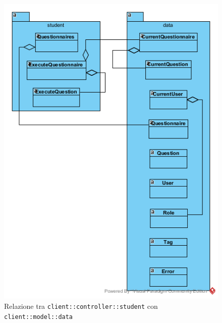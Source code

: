 \begin{center}
	\begin{figure}[H]
		\centering \includegraphics[scale=4, max width=\textwidth, max height=\myheight]{../img/diagrammiClassi/client/controller/controllerStudent_modelData.png}
		\caption{Relazione tra \texttt{client::controller::student} con \texttt{client::model::data}}
	\end{figure}
\end{center}

